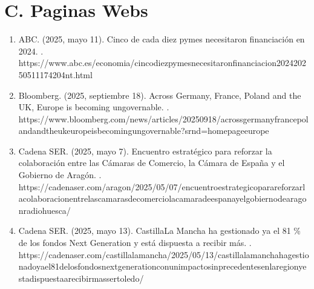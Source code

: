 \documentclass[letterpaper,10pt,spanish]{sphinxmanual}
\begin{document}
\section{C. Paginas Webs}
\label{\detokenize{Bibliografia:c-paginas-webs}}\begin{enumerate}
%
\item {} 
\sphinxAtStartPar
ABC. (2025, mayo 11). Cinco de cada diez pymes necesitaron financiación en 2024. . https://www.abc.es/economia/cinco\sphinxhyphen{}diez\sphinxhyphen{}pymes\sphinxhyphen{}necesitaron\sphinxhyphen{}financiacion\sphinxhyphen{}2024\sphinxhyphen{}20250511174204\sphinxhyphen{}nt.html

\item {} 
\sphinxAtStartPar
Bloomberg. (2025, septiembre 18). Across Germany, France, Poland and the UK, Europe is becoming ungovernable. . https://www.bloomberg.com/news/articles/2025\sphinxhyphen{}09\sphinxhyphen{}18/across\sphinxhyphen{}germany\sphinxhyphen{}france\sphinxhyphen{}poland\sphinxhyphen{}and\sphinxhyphen{}the\sphinxhyphen{}uk\sphinxhyphen{}europe\sphinxhyphen{}is\sphinxhyphen{}becoming\sphinxhyphen{}ungovernable?srnd=homepage\sphinxhyphen{}europe

\item {} 
\sphinxAtStartPar
Cadena SER. (2025, mayo 7). Encuentro estratégico para reforzar la colaboración entre las Cámaras de Comercio, la Cámara de España y el Gobierno de Aragón. . https://cadenaser.com/aragon/2025/05/07/encuentro\sphinxhyphen{}estrategico\sphinxhyphen{}para\sphinxhyphen{}reforzar\sphinxhyphen{}la\sphinxhyphen{}colaboracion\sphinxhyphen{}entre\sphinxhyphen{}las\sphinxhyphen{}camaras\sphinxhyphen{}de\sphinxhyphen{}comercio\sphinxhyphen{}la\sphinxhyphen{}camara\sphinxhyphen{}de\sphinxhyphen{}espana\sphinxhyphen{}y\sphinxhyphen{}el\sphinxhyphen{}gobierno\sphinxhyphen{}de\sphinxhyphen{}aragon\sphinxhyphen{}radio\sphinxhyphen{}huesca/

\item {} 
\sphinxAtStartPar
Cadena SER. (2025, mayo 13). Castilla\sphinxhyphen{}La Mancha ha gestionado ya el 81 \% de los fondos Next Generation y está dispuesta a recibir más. . https://cadenaser.com/castillalamancha/2025/05/13/castilla\sphinxhyphen{}la\sphinxhyphen{}mancha\sphinxhyphen{}ha\sphinxhyphen{}gestionado\sphinxhyphen{}ya\sphinxhyphen{}el\sphinxhyphen{}81\sphinxhyphen{}de\sphinxhyphen{}los\sphinxhyphen{}fondos\sphinxhyphen{}next\sphinxhyphen{}generation\sphinxhyphen{}con\sphinxhyphen{}un\sphinxhyphen{}impacto\sphinxhyphen{}sin\sphinxhyphen{}precedentes\sphinxhyphen{}en\sphinxhyphen{}la\sphinxhyphen{}region\sphinxhyphen{}y\sphinxhyphen{}esta\sphinxhyphen{}dispuesta\sphinxhyphen{}a\sphinxhyphen{}recibir\sphinxhyphen{}mas\sphinxhyphen{}ser\sphinxhyphen{}toledo/


\end{enumerate}
\end{document}
